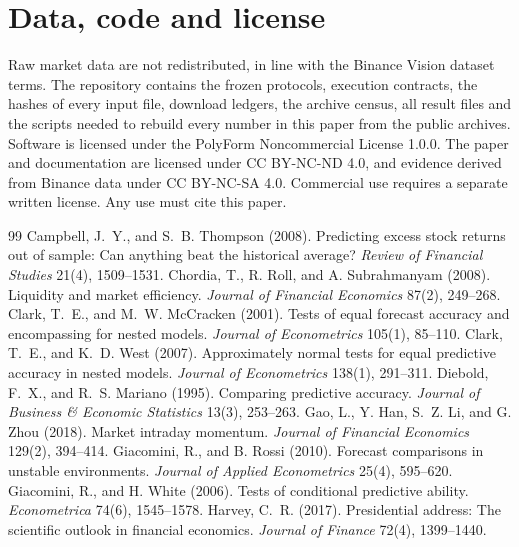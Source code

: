 \documentclass[11pt]{article}
\begin{document}
\section*{Data, code and license}
Raw market data are not redistributed, in line with the Binance Vision dataset terms. The repository contains the frozen protocols, execution contracts, the hashes of every input file, download ledgers, the archive census, all result files and the scripts needed to rebuild every number in this paper from the public archives. Software is licensed under the PolyForm Noncommercial License 1.0.0. The paper and documentation are licensed under CC BY-NC-ND 4.0, and evidence derived from Binance data under CC BY-NC-SA 4.0. Commercial use requires a separate written license. Any use must cite this paper.

\begin{thebibliography}{99}
\setlength{\itemsep}{1pt}\small
{} Campbell, J.~Y., and S.~B. Thompson (2008). Predicting excess stock returns out of sample: Can anything beat the historical average? \emph{Review of Financial Studies} 21(4), 1509--1531.
 Chordia, T., R. Roll, and A. Subrahmanyam (2008). Liquidity and market efficiency. \emph{Journal of Financial Economics} 87(2), 249--268.
 Clark, T.~E., and M.~W. McCracken (2001). Tests of equal forecast accuracy and encompassing for nested models. \emph{Journal of Econometrics} 105(1), 85--110.
 Clark, T.~E., and K.~D. West (2007). Approximately normal tests for equal predictive accuracy in nested models. \emph{Journal of Econometrics} 138(1), 291--311.
 Diebold, F.~X., and R.~S. Mariano (1995). Comparing predictive accuracy. \emph{Journal of Business \& Economic Statistics} 13(3), 253--263.
 Gao, L., Y. Han, S.~Z. Li, and G. Zhou (2018). Market intraday momentum. \emph{Journal of Financial Economics} 129(2), 394--414.
 Giacomini, R., and B. Rossi (2010). Forecast comparisons in unstable environments. \emph{Journal of Applied Econometrics} 25(4), 595--620.
 Giacomini, R., and H. White (2006). Tests of conditional predictive ability. \emph{Econometrica} 74(6), 1545--1578.
 Harvey, C.~R. (2017). Presidential address: The scientific outlook in financial economics. \emph{Journal of Finance} 72(4), 1399--1440.

\end{thebibliography}
\end{document}
